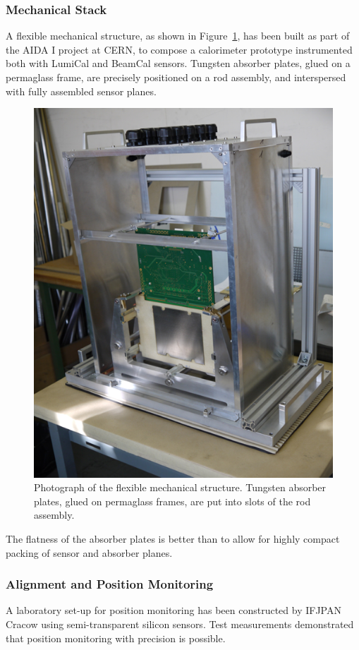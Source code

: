 \subsubsection{Mechanical Stack}

A flexible mechanical structure, as shown in  Figure~\ref{fig:mechanical_structure}, has been built as part of the AIDA I project at CERN,
to compose a calorimeter prototype instrumented both with LumiCal and BeamCal sensors. Tungsten absorber plates, glued on a permaglass
frame, are precisely
positioned on a rod assembly, and interspersed with fully assembled sensor planes.
\begin{figure}[hbp]
\centering
\includegraphics[width=0.6\columnwidth,]{Calorimeter/FCAL/figs/mechanical_structure_2}
\caption{Photograph of the flexible mechanical structure. Tungsten absorber plates, glued on permaglass frames, are put into slots of the
rod assembly.}
\label{fig:mechanical_structure}
\end{figure}
The flatness of the absorber plates is better than \unit[50]{\micron} to allow for highly compact packing of sensor and absorber planes.

\subsubsection{Alignment and Position Monitoring }

A laboratory set-up for position monitoring has been constructed by IFJPAN Cracow using semi-transparent
silicon sensors. Test measurements demonstrated that position monitoring with \micron precision is possible.


